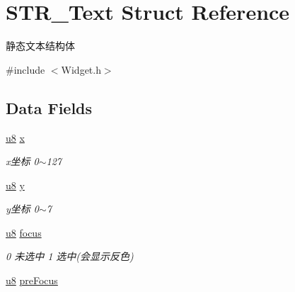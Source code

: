 \hypertarget{struct_s_t_r___text}{\section{\-S\-T\-R\-\_\-\-Text \-Struct \-Reference}
\label{struct_s_t_r___text}
}


静态文本结构体  




{\ttfamily \#include $<$\-Widget.\-h$>$}

\subsection*{\-Data \-Fields}
\begin{DoxyCompactItemize}
\item 
\hypertarget{struct_s_t_r___text_a66ab7498cbcfba822aa9a2891beffae2}{\hyperlink{group___b_s_p_gaed742c436da53c1080638ce6ef7d13de}{u8} \hyperlink{struct_s_t_r___text_a66ab7498cbcfba822aa9a2891beffae2}{x}}\label{struct_s_t_r___text_a66ab7498cbcfba822aa9a2891beffae2}

\begin{DoxyCompactList}\small\item\em x坐标 0$\sim$127 \end{DoxyCompactList}\item 
\hypertarget{struct_s_t_r___text_ad87f9078b74ef74a58041131d06283c2}{\hyperlink{group___b_s_p_gaed742c436da53c1080638ce6ef7d13de}{u8} \hyperlink{struct_s_t_r___text_ad87f9078b74ef74a58041131d06283c2}{y}}\label{struct_s_t_r___text_ad87f9078b74ef74a58041131d06283c2}

\begin{DoxyCompactList}\small\item\em y坐标 0$\sim$7 \end{DoxyCompactList}\item 
\hypertarget{struct_s_t_r___text_a512195d8de94b163b7913ca72593f195}{\hyperlink{group___b_s_p_gaed742c436da53c1080638ce6ef7d13de}{u8} \hyperlink{struct_s_t_r___text_a512195d8de94b163b7913ca72593f195}{focus}}\label{struct_s_t_r___text_a512195d8de94b163b7913ca72593f195}

\begin{DoxyCompactList}\small\item\em 0 未选中 1 选中(会显示反色) \end{DoxyCompactList}\item 
\hypertarget{struct_s_t_r___text_a56b2126aaa45ff97f9408d5648925f68}{\hyperlink{group___b_s_p_gaed742c436da53c1080638ce6ef7d13de}{u8} \hyperlink{struct_s_t_r___text_a56b2126aaa45ff97f9408d5648925f68}{pre\-Focus}}\label{struct_s_t_r___text_a56b2126aaa45ff97f9408d5648925f68}


\end{DoxyCompactItemize}
